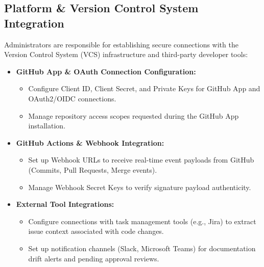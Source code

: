 \subsection{Platform \& Version Control System Integration}
Administrators are responsible for establishing secure connections with the Version Control System (VCS) infrastructure and third-party developer tools:
\begin{itemize}
    \item \textbf{GitHub App \& OAuth Connection Configuration:}
    \begin{itemize}
        \item Configure Client ID, Client Secret, and Private Keys for GitHub App and OAuth2/OIDC connections.
        \item Manage repository access scopes requested during the GitHub App installation.
    \end{itemize}
    \item \textbf{GitHub Actions \& Webhook Integration:}
    \begin{itemize}
        \item Set up Webhook URLs to receive real-time event payloads from GitHub (Commits, Pull Requests, Merge events).
        \item Manage Webhook Secret Keys to verify signature payload authenticity.
    \end{itemize}
    \item \textbf{External Tool Integrations:}
    \begin{itemize}
        \item Configure connections with task management tools (e.g., Jira) to extract issue context associated with code changes.
        \item Set up notification channels (Slack, Microsoft Teams) for documentation drift alerts and pending approval reviews.
    \end{itemize}
\end{itemize}

